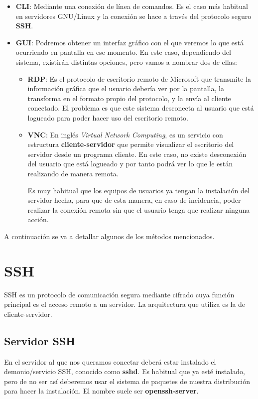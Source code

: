 \begin{itemize}
    \item \textbf{CLI}: Mediante una conexión de línea de comandos. Es el caso más habitual en servidores GNU/Linux y la conexión se hace a través del protocolo seguro \textbf{SSH}.

    \item \textbf{GUI}: Podremos obtener un interfaz gráfico con el que veremos lo que está ocurriendo en pantalla en ese momento. En este caso, dependiendo del sistema, existirán distintas opciones, pero vamos a nombrar dos de ellas:

    \begin{itemize}
        \item \textbf{RDP}: Es el protocolo de escritorio remoto de Microsoft que transmite la información gráfica que el usuario debería ver por la pantalla, la transforma en el formato propio del protocolo, y la envía al cliente conectado. El problema es que este sistema desconecta al usuario que está logueado para poder hacer uso del escritorio remoto.

        \item \textbf{VNC}: En inglés \textit{Virtual Network Computing}, es un servicio con estructura \textbf{cliente-servidor} que permite visualizar el escritorio del servidor desde un programa cliente. En este caso, no existe desconexión del usuario que está logueado y por tanto podrá ver lo que le están realizando de manera remota.

        Es muy habitual que los equipos de usuarios ya tengan la instalación del servidor hecha, para que de esta manera, en caso de incidencia, poder realizar la conexión remota sin que el usuario tenga que realizar ninguna acción.
    \end{itemize}
\end{itemize}

A continuación se va a detallar algunos de los métodos mencionados.


\section{SSH}
SSH es un protocolo de comunicación segura mediante cifrado cuya función principal es el acceso remoto a un servidor. La arquitectura que utiliza es la de cliente-servidor.

\subsection{Servidor SSH}
En el servidor al que nos queramos conectar deberá estar instalado el demonio/servicio SSH, conocido como \textbf{sshd}. Es habitual que ya esté instalado, pero de no ser así deberemos usar el sistema de paquetes de nuestra distribución para hacer la instalación. El nombre suele ser \textbf{openssh-server}.

